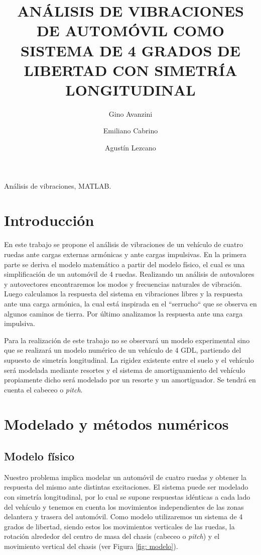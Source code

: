 \documentclass[oneside, a4paper, spanish, links]{amca}
\title{ANÁLISIS DE VIBRACIONES DE AUTOMÓVIL COMO SISTEMA DE 4 GRADOS DE LIBERTAD CON SIMETRÍA LONGITUDINAL}
\author[\voidaffil]{Gino Avanzini}
\author[\voidaffil]{Emiliano Cabrino}
\author[\voidaffil]{Agustín Lezcano}
\affil[\voidaffil]{Mecánica Vibratoria, 
Facultad de Ingeniería, 
Universidad Nacional de Cuyo}
\begin{document}
\vspace{3cm}

\maketitle
\begin{keywords}
Análisis de vibraciones, MATLAB.
\end{keywords}


\section{Introducción}
En este trabajo se propone el análisis de vibraciones de un vehículo de cuatro ruedas ante cargas externas armónicas y ante cargas impulsivas. En la primera parte se deriva el modelo matemático a partir del modelo físico, el cual es una simplificación de un automóvil de 4 ruedas. Realizando un análisis de autovalores y autovectores encontraremos los modos y frecuencias naturales de vibración. Luego calculamos la respuesta del sistema en vibraciones libres y la respuesta ante una carga armónica, la cual está inspirada en el ``serrucho`` que se observa en algunos caminos de tierra. Por último analizamos la respuesta ante una carga impulsiva. 

Para la realización de este trabajo no se observará un modelo experimental sino que se realizará un modelo numérico de un vehículo de 4 GDL, partiendo del supuesto de simetría longitudinal. La rigidez existente entre el suelo y el vehículo será modelada mediante resortes y el sistema de amortiguamiento del vehículo propiamente dicho será modelado por un resorte y un amortiguador. Se tendrá en cuenta el cabeceo o \textit{pitch}.

\newpage
\section{Modelado y métodos numéricos}
\subsection{Modelo físico}

Nuestro problema implica modelar un automóvil de cuatro ruedas y obtener la respuesta del mismo ante distintas excitaciones. El sistema puede ser modelado con simetría longitudinal, por lo cual se supone respuestas idénticas a cada lado del vehículo y tenemos en cuenta los movimientos independientes de las zonas delantera y trasera del automóvil. Como modelo utilizaremos un sistema de 4 grados de libertad, siendo estos los movimientos verticales de las ruedas, la rotación alrededor del centro de masa del chasis (cabeceo o \textit{pitch}) y el movimiento vertical del chasis (ver Figura \ref{fig: modelo}).
\end{document}
